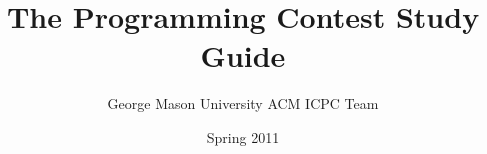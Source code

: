 \documentclass[11pt]{book}
\begin{document}
\author{George Mason University ACM ICPC Team}
\date{Spring 2011}
\title{The Programming Contest Study Guide}

\frontmatter
\maketitle
\tableofcontents

\mainmatter


\backmatter
\end{document}
